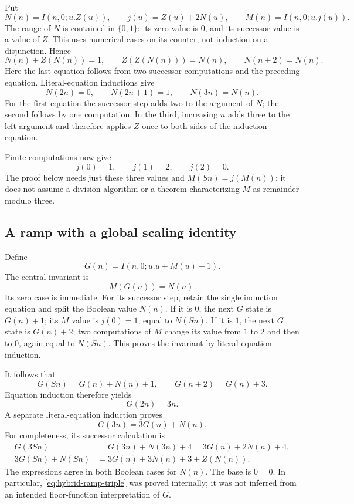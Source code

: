 \documentclass[11pt,letterpaper]{article}
\theoremstyle{definition}\newtheorem{definition}[theorem]{Definition}
\theoremstyle{remark}\newtheorem{remark}[theorem]{Remark}
\begin{document}
Put
\[
 N(n)=I(n,0;u.Z(u)),\qquad
 j(u)=Z(u)+2N(u),\qquad
 M(n)=I(n,0;u.j(u)).
\]
The range of $N$ is contained in $\{0,1\}$: its zero value is $0$,
and its successor value is a value of $Z$.  This uses numerical cases
on its counter, not induction on a disjunction.  Hence
\begin{equation}
 N(n)+Z(N(n))=1,\qquad
 Z(Z(N(n)))=N(n),\qquad N(n+2)=N(n).
 \label{eq:hybrid-parity}
\end{equation}
Here the last equation follows from two successor computations and
the preceding equation.  Literal-equation inductions give
\begin{equation}
 N(2n)=0,\qquad N(2n+1)=1,\qquad N(3n)=N(n).
 \label{eq:hybrid-parity-scaling}
\end{equation}
For the first equation the successor step adds two to the argument of
$N$; the second follows by one computation.  In the third, increasing
$n$ adds three to the left argument and therefore applies $Z$ once to
both sides of the induction equation.

Finite computations now give
\[
 j(0)=1,\qquad j(1)=2,\qquad j(2)=0.
\]
The proof below needs just these three values and
$M(Sn)=j(M(n))$; it does not assume a division algorithm or a theorem
characterizing $M$ as remainder modulo three.

\subsection{A ramp with a global scaling identity}

Define
\[
 G(n)=I(n,0;u.u+M(u)+1).
\]
The central invariant is
\begin{equation}
 M(G(n))=N(n).
 \label{eq:hybrid-ramp-invariant}
\end{equation}
Its zero case is immediate.  For its successor step, retain the
single induction equation and split the Boolean value $N(n)$.
If it is $0$, the next $G$ state is $G(n)+1$; its $M$ value is
$j(0)=1$, equal to $N(Sn)$.  If it is $1$, the next $G$ state
is $G(n)+2$; two computations of $M$ change its value from $1$
to $2$ and then to $0$, again equal to $N(Sn)$.  This proves
the invariant by literal-equation induction.

It follows that
\[
 G(Sn)=G(n)+N(n)+1,\qquad G(n+2)=G(n)+3.
\]
Equation induction therefore yields
\begin{equation}
 G(2n)=3n.
 \label{eq:hybrid-ramp-double}
\end{equation}
A separate literal-equation induction proves
\begin{equation}
 G(3n)=3G(n)+N(n).
 \label{eq:hybrid-ramp-triple}
\end{equation}
For completeness, its successor calculation is
\begin{align*}
 G(3Sn)
 &=G(3n)+N(3n)+4
   =3G(n)+2N(n)+4,\\
 3G(Sn)+N(Sn)
 &=3G(n)+3N(n)+3+Z(N(n)).
\end{align*}
The expressions agree in both Boolean cases for $N(n)$.
The base is $0=0$.  In particular,
\eqref{eq:hybrid-ramp-triple} was proved internally; it was not
inferred from an intended floor-function interpretation of $G$.
\end{document}
